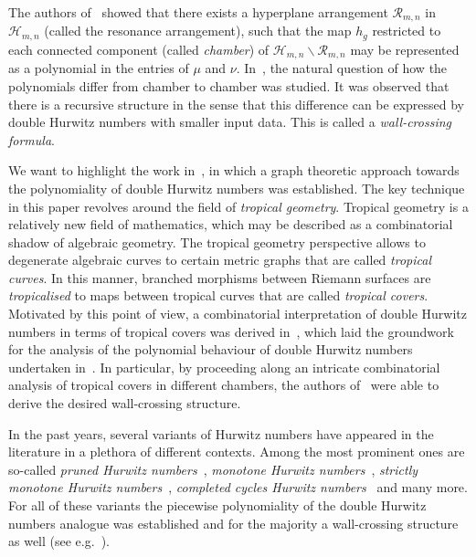 The authors of~\cite{GJV05} showed that there exists a hyperplane arrangement $\mathcal{R}_{m,n}$ in $\mathcal{H}_{m,n}$ (called the resonance arrangement), such that the map $h_g$ restricted to each connected component (called \textit{chamber}) of $\mathcal{H}_{m,n}\backslash\mathcal{R}_{m,n}$ may be represented as a polynomial in the entries of $\mu$ and $\nu$. In~\cite{SSV08, CJM11, Joh15}, the natural question of how the polynomials differ from chamber to chamber was studied. It was observed that there is a recursive structure in the sense that this difference can be expressed by double Hurwitz numbers with smaller input data. This is called a \textit{wall-crossing formula}.

We want to highlight the work in~\cite{CJM11}, in which a graph theoretic approach towards the polynomiality of double Hurwitz numbers was established. The key technique in this paper revolves around the field of \textit{tropical geometry}. Tropical geometry is a relatively new field of mathematics, which may be described as a combinatorial shadow of algebraic geometry. The tropical geometry perspective allows to degenerate algebraic curves to certain metric graphs that are called \textit{tropical curves}. In this manner, branched morphisms between Riemann surfaces are \textit{tropicalised} to maps between tropical curves that are called \textit{tropical covers}. Motivated by this point of view, a combinatorial interpretation of double Hurwitz numbers in terms of tropical covers was derived in~\cite{CJM10}, which laid the groundwork for the analysis of the polynomial behaviour of double Hurwitz numbers undertaken in~\cite{CJM11}. In particular, by proceeding along an intricate combinatorial analysis of tropical covers in different chambers, the authors of~\cite{CJM11} were able to derive the desired wall-crossing structure.

In the past years, several variants of Hurwitz numbers have appeared in the literature in a plethora of different contexts. Among the most prominent ones are so-called \textit{pruned Hurwitz numbers}~\cite{do2018pruned,hahn2020bi}, \textit{monotone Hurwitz numbers}~\cite{goulden2014monotone}, \textit{strictly monotone Hurwitz numbers}~\cite{kazarian2015virasoro}, \textit{completed cycles Hurwitz numbers}~\cite{okounkov2006gromov} and many more. For all of these variants the piecewise polynomiality of the double Hurwitz numbers analogue was established and for the majority a wall-crossing structure as well (see e.g.~\cite{zbMATH06791415, hahn2018wall,hahn2020wall,shadrin2012double}).

